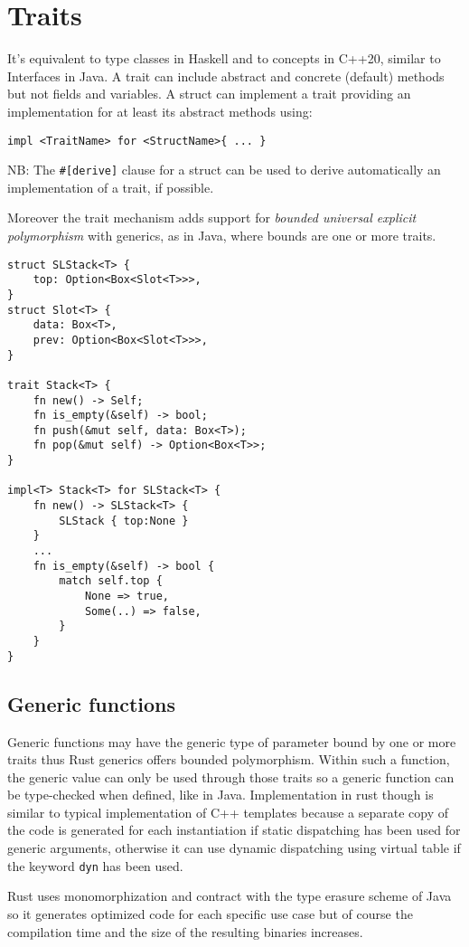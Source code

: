 \section{Traits}
It's equivalent to type classes in Haskell and to concepts in C++20, similar to Interfaces in Java.
A trait can include abstract and concrete (default) methods but not fields and variables.
A struct can implement a trait providing an implementation for at least its abstract methods using:
\begin{verbatim}
impl <TraitName> for <StructName>{ ... }
\end{verbatim}
NB: The \verb|#[derive]| clause for a struct can be used to derive automatically an implementation of a trait, if possible.


Moreover the trait mechanism adds support for \emph{bounded universal explicit polymorphism} with generics, as in Java, where bounds are one or more traits.
\begin{verbatim}
struct SLStack<T> {
    top: Option<Box<Slot<T>>>,
}
struct Slot<T> {
    data: Box<T>,
    prev: Option<Box<Slot<T>>>,
}

trait Stack<T> {
    fn new() -> Self;
    fn is_empty(&self) -> bool;
    fn push(&mut self, data: Box<T>);
    fn pop(&mut self) -> Option<Box<T>>;
}

impl<T> Stack<T> for SLStack<T> {
    fn new() -> SLStack<T> {
        SLStack { top:None }
    }
    ...
    fn is_empty(&self) -> bool {
        match self.top {
            None => true,
            Some(..) => false,
        }
    }
}
\end{verbatim}

\subsection{Generic functions}
Generic functions may have the generic type of parameter bound by one or more traits thus Rust generics offers bounded polymorphism.
Within such a function, the generic value can only be used through those traits so a generic function can be type-checked when defined, like in Java.
Implementation in rust though is similar to typical implementation of C++ templates because a separate copy of the code is generated for each instantiation if static dispatching has been used for generic arguments, otherwise it can use dynamic dispatching using virtual table if the keyword \verb|dyn| has been used.

Rust uses monomorphization and contract with the type erasure scheme of Java so it generates optimized code for each specific use case but of course the compilation time and the size of the resulting binaries increases.


